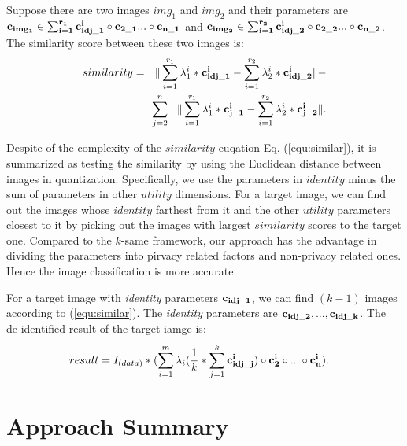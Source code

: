     Suppose there are two images $img_1$ and $img_2$ and their parameters are ${\bf c_{img_1} \in 
    \sum_{i=1}^{r_1}c_{idj\_1}^i \circ c_{2\_1} ... \circ c_{n\_1} }$ and ${\bf c_{img_2} \in 
    \sum_{i=1}^{r_2}c_{idj\_2}^i \circ c_{2\_2} ... \circ c_{n\_2} }$. The similarity score 
    between these two images is:
    \begin{equation}
    \label{equ:similar}
      \begin{aligned}
        similarity = \ \ \| \sum_{i=1}^{r_1}\lambda_1^i*{\bf c_{idj\_1}^i }  - \sum_{i=1}^{r_2}\lambda_2^i* {\bf c_{idj\_2}^i }\|  - \\
                     \sum_{j=2}^{n}\ \ \|  \sum_{i=1}^{r_1}\lambda_1^i*{\bf c_{j\_1}^i}  - \sum_{i=1}^{r_2}\lambda_2^i*{\bf c_{j\_2}^i }\|.
      \end{aligned}
    \end{equation}

    Despite of the complexity of the $similarity$ euqation Eq. (\ref{equ:similar}), it is summarized as 
    testing the similarity by using the Euclidean distance between images in quantization.
    Specifically, we use the parameters in $identity$ minus the sum of parameters in other $utility$ dimensions.
    For a target image, we can find out the images whose $identity$ farthest from it and the other
    $utility$ parameters closest to it by picking out the images with largest $similarity$ scores to the target one.
    Compared to the $k$-same framework, our approach has the advantage in dividing the parameters
    into pirvacy related factors and non-privacy related ones. Hence the image classification is
    more accurate. 

    For a target image with {\it identity} parameters ${\bf c_{idj\_1}}$, we can find $(k-1)$ images according to
    (\ref{equ:similar}). The {\it identity} parameters are ${\bf c_{idj\_2},...,c_{idj\_k}}$. The de-identified result
    of the target iamge is:
    \begin{equation}
      \begin{aligned}
        result & = I_{(data)} * (\sum_{i=1}^{m} \lambda_i(\frac{1}{k}*\sum_{j=1}^k {\bf c_{idj\_j}^i} ) \circ {\bf c_{2}^i} \circ ... \circ {\bf c_{n}^i}).
      \end{aligned}
      \label{equ:compo}
    \end{equation}

    \section{Approach Summary}

